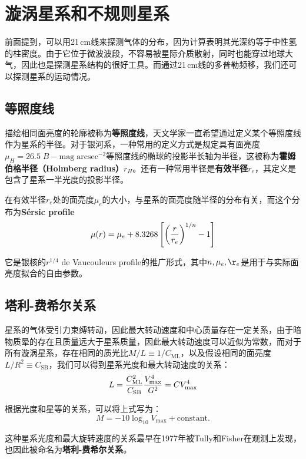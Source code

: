 \documentclass[openany]{ctexbook}
\begin{document}
\section{漩涡星系和不规则星系}
前面提到，可以用21\,cm线来探测气体的分布，因为计算表明其光深约等于中性氢的柱密度。由于它位于微波波段，不容易被星际介质散射，同时也能穿过地球大气，因此也是探测星系结构的很好工具。而通过21\,cm线的多普勒频移，我们还可以探测星系的运动情况。

\subsection{等照度线}
描绘相同面亮度的轮廓被称为\textbf{等照度线}，天文学家一直希望通过定义某个等照度线作为星系的半径。对于银河系，一种常用的定义方式是规定具有面亮度$\mu_H=26.5\;B-\mathrm{mag\;arcsec^{-2}}$等照度线的椭球的投影半长轴为半径，这被称为\textbf{霍姆伯格半径（Holmberg radius）}$r_H$。还有一种常用半径是\textbf{有效半径}$r_e$，其定义是包含了星系一半光度的投影半径。

在有效半径$r_e$处的面亮度$\mu_e$的大小，与星系的面亮度随半径的分布有关，而这个分布为\textbf{Sérsic profile}
\begin{equation}
  \mu(r)=\mu_e+8.3268\left[\left({r\over r_e}\right)^{1/n}-1\right]
\end{equation}

它是银核的$r^{1/4}$ de Vaucouleurs profile的推广形式，其中$n, \mu_e, \r_e$是用于与实际面亮度拟合的自由参数。

\subsection{塔利-费希尔关系}
星系的气体受引力束缚转动，因此最大转动速度和中心质量存在一定关系，由于暗物质晕的存在且质量远大于星系质量，因此最大转动速度可以近似为常数，而对于所有漩涡星系，存在相同的质光比$M/L\equiv 1/C_\mathrm{ML}$，以及假设相同的面亮度$L/R^2\equiv C_\mathrm{SB}$，我们可以得到星系光度和最大转动速度的关系：
\begin{equation}
  L={C_\mathrm{ML}^2\over C_\mathrm{SB}}{V_\mathrm{max}^4\over G^2}=CV_\mathrm{max}^4
\end{equation}

根据光度和星等的关系，可以将上式写为：
\begin{equation}
  M=-10\log_{10}V_\mathrm{max}+\mathrm{constant.}
\end{equation}

这种星系光度和最大旋转速度的关系最早在1977年被Tully和Fisher在观测上发现，也因此被命名为\textbf{塔利-费希尔关系}。
\end{document}
